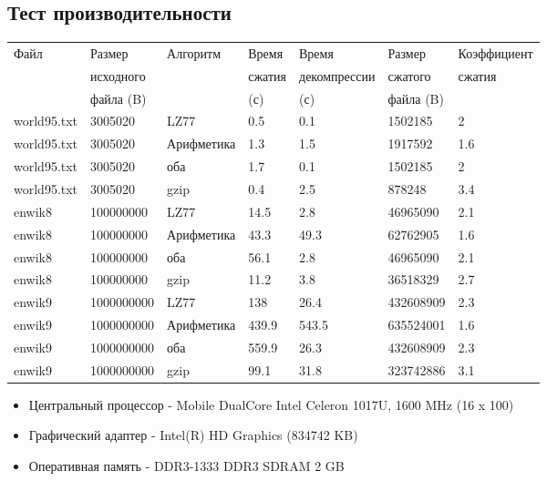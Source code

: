 \documentclass[12pt]{article}
\begin{document}
\subsection*{Тест производительности}

\noindent
\begin{tabular}{| l | l | l | l | l | l | l |}
	\hline
	Файл             & Размер 	  & Алгоритм   & Время  & Время        & Размер    & Коэффициент \\
	                 & исходного  &            & сжатия & декомпрессии & сжатого   & сжатия      \\
	                 & файла (B)  &            & (с)    & (с)          & файла (B) &             \\
	\hline
	world95.txt      & 3005020    & LZ77       & 0.5    & 0.1          & 1502185   & 2\\
	\hline
	world95.txt      & 3005020    & Арифметика & 1.3    & 1.5          & 1917592   & 1.6\\
	\hline
	world95.txt      & 3005020    & оба        & 1.7    & 0.1          & 1502185   & 2\\
	\hline
	world95.txt      & 3005020    & gzip       & 0.4    & 2.5          & 878248    & 3.4\\
	\hline
	enwik8           & 100000000  & LZ77       & 14.5   & 2.8          & 46965090  & 2.1\\
	\hline
	enwik8           & 100000000  & Арифметика & 43.3   & 49.3         & 62762905  & 1.6\\
	\hline
	enwik8           & 100000000  & оба        & 56.1   & 2.8          & 46965090  & 2.1\\
	\hline
	enwik8           & 100000000  & gzip       & 11.2   & 3.8          & 36518329  & 2.7\\
	\hline
	enwik9           & 1000000000 & LZ77       & 138    & 26.4         & 432608909 & 2.3\\
	\hline
	enwik9           & 1000000000 & Арифметика & 439.9  & 543.5        & 635524001 & 1.6\\
	\hline
	enwik9           & 1000000000 & оба        & 559.9  & 26.3         & 432608909 & 2.3\\
	\hline
	enwik9           & 1000000000 & gzip       & 99.1   & 31.8         & 323742886 & 3.1\\
	\hline
	

\end{tabular}

\begin{itemize}
	\item Центральный процессор - Mobile DualCore Intel Celeron 1017U, 1600 MHz (16 x 100)
	\item Графический адаптер - Intel(R) HD Graphics (834742 KB)
	\item Оперативная память - DDR3-1333 DDR3 SDRAM 2 GB
\end{itemize}
\end{document}
